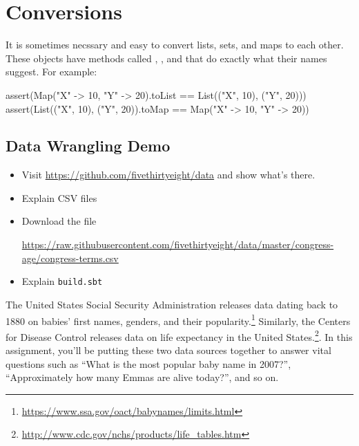 \documentclass{book}
\begin{document}
\section{Conversions}

It is sometimes necssary and easy to convert lists, sets, and maps to each
other. These objects have methods called ,
, and  that do exactly what their
names suggest. For example:
%
\begin{scalacode}
assert(Map("X" -> 10, "Y" -> 20).toList == List(("X", 10), ("Y", 20)))
assert(List(("X", 10), ("Y", 20)).toMap == Map("X" -> 10, "Y" -> 20))
\end{scalacode}

\begin{instructor}

\section{Data Wrangling Demo}

\begin{itemize}

  \item Visit \url{https://github.com/fivethirtyeight/data} and show what's
  there.

  \item Explain CSV files

  \item Download the file

  \url{https://raw.githubusercontent.com/fivethirtyeight/data/master/congress-age/congress-terms.csv}

  \item Explain \texttt{build.sbt}

\end{itemize}


\end{instructor}



The United States Social Security Administration releases data dating back to
1880 on babies' first names, genders, and their
popularity.\footnote{\url{https://www.ssa.gov/oact/babynames/limits.html}}
Similarly, the Centers for Disease Control releases data on life expectancy
in the United States.\footnote{\url{http://www.cdc.gov/nchs/products/life_tables.htm}}.
In this assignment, you'll be putting these two data sources together
to answer vital questions such as ``What is the most popular baby name in 2007?'',
``Approximately how many Emmas are alive today?'', and so on.
\end{document}
